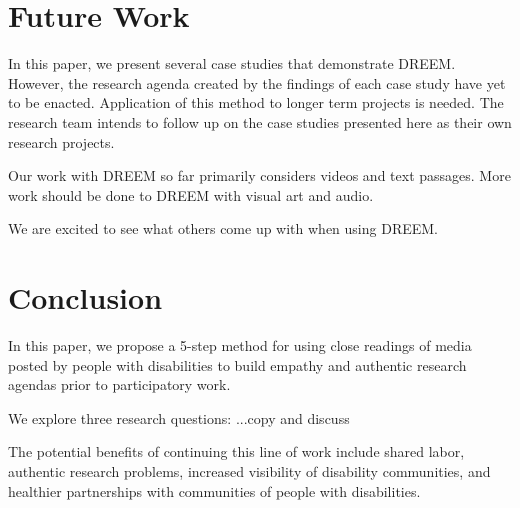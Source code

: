 \section{Future Work}
In this paper, we present several case studies that demonstrate DREEM. However, the research agenda created by the findings of each case study have yet to be enacted. Application of this method to longer term projects is needed. The research team intends to follow up on the case studies presented here as their own research projects. 

Our work with DREEM so far primarily considers videos and text passages. More work should be done to DREEM with visual art and audio. 

We are excited to see what others come up with when using DREEM. 

\section{Conclusion}
In this paper, we propose a 5-step method for using close readings of media posted by people with disabilities to build empathy and authentic research agendas prior to participatory work. 

We explore three research questions: {\color{red}...copy and discuss}

The potential benefits of continuing this line of work include shared labor, authentic research problems, increased visibility of disability communities, and healthier partnerships with communities of people with disabilities. 

\balance

